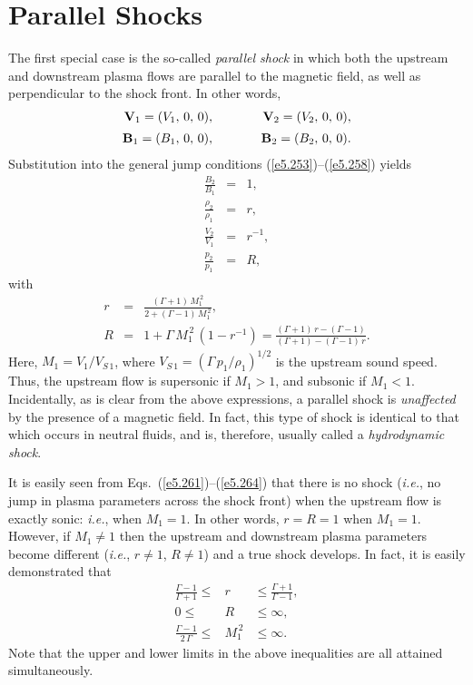 \section{Parallel Shocks}\label{shydro}
The first special case is the so-called {\em parallel shock}\/ in which both the
upstream and downstream plasma flows are  parallel to the magnetic field, as well as  perpendicular to the shock
front. In other
words,
\begin{eqnarray}
{\bf V}_1 = (V_1,\,0,\,0),&\mbox{\hspace{1cm}}&{\bf V}_2 = (V_2,\,0,\,0),\\[0.5ex]
{\bf B}_1 = (B_1,\,0,\,0),&\mbox{\hspace{1cm}}&{\bf B}_2 = (B_2,\,0,\,0).
\end{eqnarray}
Substitution  into the general jump conditions (\ref{e5.253})--(\ref{e5.258}) yields
\begin{eqnarray}\label{e5.261}
\frac{B_2}{B_1} &=& 1,\\[0.5ex]
\frac{\rho_2}{\rho_1} &=& r,\\[0.5ex]
\frac{V_2}{V_1}&=& r^{-1},\\[0.5ex]
\frac{p_2}{p_1} &=& R,\label{e5.264}
\end{eqnarray}
with
\begin{eqnarray}\label{e5.265}
r& =& \frac{(\Gamma+1)\,M_1^{\,2}}{2+(\Gamma-1)\,M_1^{\,2}},\\[0.5ex]
R &=& 1+ \Gamma\,M_1^{\,2}\,(1-r^{-1})= \frac{(\Gamma+1)\,r-(\Gamma-1)}{(\Gamma+1)-(\Gamma-1)\,r}.\label{e5.266}
\end{eqnarray}
Here, $M_1= V_1/V_{S\,1}$, where $V_{S\,1}=(\Gamma\,p_1/\rho_1)^{1/2}$
is the upstream sound speed. Thus, the upstream flow  is supersonic if $M_1>1$, and subsonic if $M_1<1$. Incidentally, as is clear from
the above expressions, a
parallel shock is {\em unaffected}\/ by the presence of a magnetic field. In fact, this
type of shock is identical to that which occurs in neutral fluids, and is, 
therefore, usually called a {\em hydrodynamic shock}. 

It is easily seen from  Eqs.~(\ref{e5.261})--(\ref{e5.264}) that there is no shock ({\em i.e.}, no jump in plasma parameters across the shock front) when the upstream flow is exactly
sonic: {\em i.e.}, when $M_1=1$. In other words, $r=R=1$ when $M_1=1$. 
However, if $M_1\neq 1$ then the upstream
and downstream plasma parameters become  different ({\em i.e.}, $r\neq 1$, $R\neq 1$) and a true shock develops. 
In fact, it is easily demonstrated that
\begin{eqnarray}\label{e5.267}
\frac{\Gamma-1}{\Gamma+1} \leq & r &\leq \frac{\Gamma+1}{\Gamma-1},\\[0.5ex]
0\leq &R &\leq \infty,\\[0.5ex]
\frac{\Gamma-1}{2\,\Gamma}\leq  &M_1^{\,2}& \leq \infty.\label{e5.269}
\end{eqnarray}
Note that the upper and lower limits in the above inequalities are all attained simultaneously.

